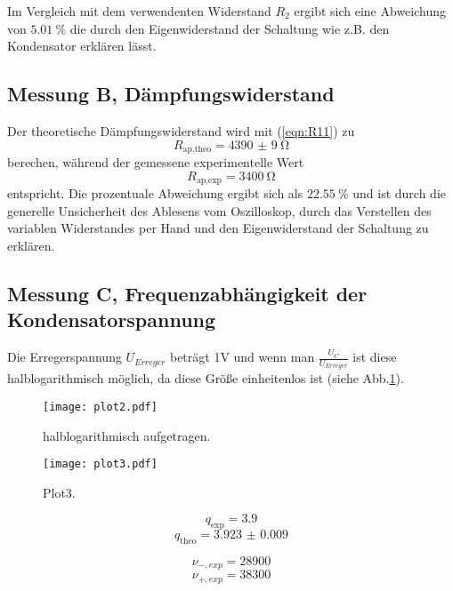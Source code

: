Im Vergleich mit dem verwendenten Widerstand $R_{\text{2}}$ ergibt sich eine Abweichung
von $\SI{5.01}{\percent}$ die durch den Eigenwiderstand der Schaltung wie z.B. den Kondensator
erklären lässt.

\subsection{Messung B, Dämpfungswiderstand}
Der theoretische Dämpfungswiderstand wird mit (\ref{eqn:R11}) zu
\begin{equation}
  R_{\text{ap,theo}} = \SI{4390(9)}{\ohm}
  \end{equation}
  berechen, während der gemessene experimentelle Wert
\begin{equation}
  R_{\text{ap,exp}} = \SI{3400}{\ohm}
\end{equation}
entspricht.
Die prozentuale Abweichung ergibt sich als $\SI{22.55}{\percent}$ und ist durch
die generelle Unsicherheit des Ablesens vom Oszilloskop, durch das Verstellen
des variablen Widerstandes per Hand und den Eigenwiderstand der Schaltung  zu erklären.

\subsection{Messung C, Frequenzabhängigkeit der Kondensatorspannung}

Die Erregerspannung $U_{Erreger}$ beträgt 1V und wenn man $\frac{U_{C}}{U_{Erreger}}$
ist diese halblogarithmisch möglich, da diese Größe einheitenlos ist (siehe Abb.\ref{fig:plot2}).

\begin{figure}
  \centering
  \texttt{[image: plot2.pdf]}
  \caption{halblogarithmisch aufgetragen.}
  \label{fig:plot2}
\end{figure}

\begin{figure}
  \centering
  \texttt{[image: plot3.pdf]}
  \caption{Plot3.}
  \label{fig:plot3}
\end{figure}

\begin{equation}
  q_{\text{exp}} = 3.9
\end{equation}
\begin{equation}
  q_{\text{theo}} = \num{3.923(9)}
\end{equation}

\begin{equation}
  \nu_{-,exp} = 28900
\end{equation}
\begin{equation}
  \nu_{+,exp} = 38300
\end{equation}

